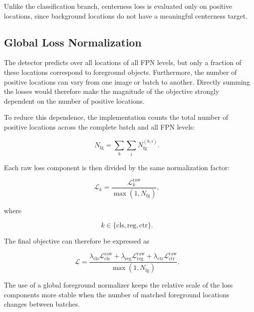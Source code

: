 \documentclass[11pt,a4paper]{article}
\begin{document}
Unlike the classification branch, centerness loss is evaluated only on
positive locations, since background locations do not have a meaningful
centerness target.

\subsection{Global Loss Normalization}
\label{subsec:loss_normalization}

The detector predicts over all locations of all FPN levels, but only a
fraction of these locations correspond to foreground objects. Furthermore,
the number of positive locations can vary from one image or batch to another.
Directly summing the losses would therefore make the magnitude of the
objective strongly dependent on the number of positive locations.

To reduce this dependence, the implementation counts the total number of
positive locations across the complete batch and all FPN levels:

\begin{equation}
N_{\mathrm{fg}}
=
\sum_b
\sum_i
N_{\mathrm{fg}}^{(b,i)}.
\end{equation}

Each raw loss component is then divided by the same normalization factor:

\begin{equation}
\mathcal{L}_k
=
\frac{
\mathcal{L}_k^{\mathrm{raw}}
}{
\max(1,N_{\mathrm{fg}})
},
\end{equation}

where

\begin{equation}
k\in
\{
\mathrm{cls},
\mathrm{reg},
\mathrm{ctr}
\}.
\end{equation}

The final objective can therefore be expressed as

\begin{equation}
\mathcal{L}
=
\frac{
\lambda_{\mathrm{cls}}
\mathcal{L}_{\mathrm{cls}}^{\mathrm{raw}}
+
\lambda_{\mathrm{reg}}
\mathcal{L}_{\mathrm{reg}}^{\mathrm{raw}}
+
\lambda_{\mathrm{ctr}}
\mathcal{L}_{\mathrm{ctr}}^{\mathrm{raw}}
}{
\max(1,N_{\mathrm{fg}})
}.
\end{equation}

The use of a global foreground normalizer keeps the relative scale of the
loss components more stable when the number of matched foreground locations
changes between batches.
\end{document}
